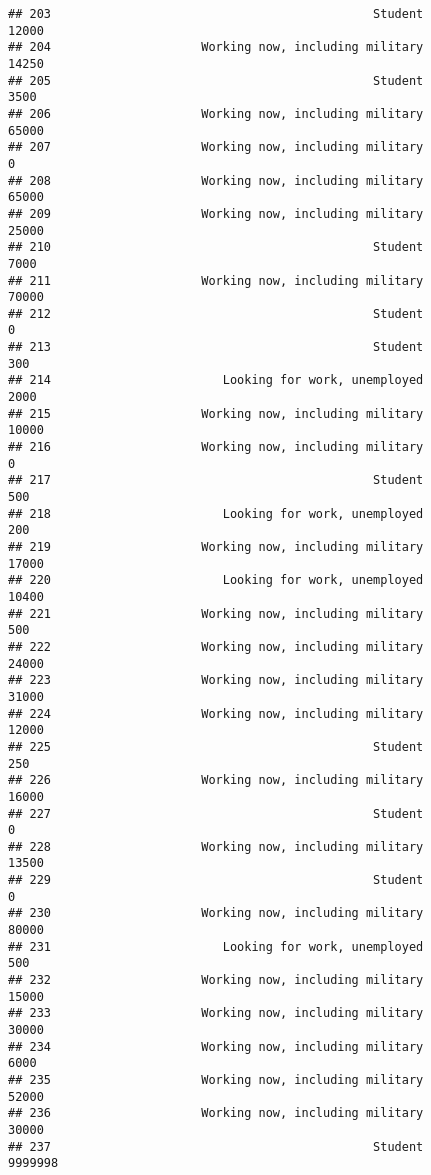 \documentclass[]{book}
\theoremstyle{definition}
\theoremstyle{definition}
\theoremstyle{remark}
\begin{document}
\begin{verbatim}
## 203                                             Student           12000
## 204                     Working now, including military           14250
## 205                                             Student            3500
## 206                     Working now, including military           65000
## 207                     Working now, including military               0
## 208                     Working now, including military           65000
## 209                     Working now, including military           25000
## 210                                             Student            7000
## 211                     Working now, including military           70000
## 212                                             Student               0
## 213                                             Student             300
## 214                        Looking for work, unemployed            2000
## 215                     Working now, including military           10000
## 216                     Working now, including military               0
## 217                                             Student             500
## 218                        Looking for work, unemployed             200
## 219                     Working now, including military           17000
## 220                        Looking for work, unemployed           10400
## 221                     Working now, including military             500
## 222                     Working now, including military           24000
## 223                     Working now, including military           31000
## 224                     Working now, including military           12000
## 225                                             Student             250
## 226                     Working now, including military           16000
## 227                                             Student               0
## 228                     Working now, including military           13500
## 229                                             Student               0
## 230                     Working now, including military           80000
## 231                        Looking for work, unemployed             500
## 232                     Working now, including military           15000
## 233                     Working now, including military           30000
## 234                     Working now, including military            6000
## 235                     Working now, including military           52000
## 236                     Working now, including military           30000
## 237                                             Student         9999998

\end{verbatim}
\end{document}
